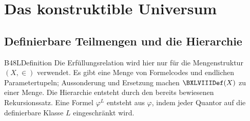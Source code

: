 \section{Das konstruktible Universum}

\subsection{Definierbare Teilmengen und die Hierarchie}

{B48LDefinition}{
}
\noindent
Die Erfüllungsrelation wird hier nur für die Mengenstruktur
\((X,\in)\) verwendet. Es gibt eine Menge von Formelcodes und endlichen
Parametertupeln; Aussonderung und Ersetzung machen
\(\BXLVIIIDef(X)\) zu einer Menge. Die Hierarchie entsteht durch den
bereits bewiesenen Rekursionssatz. Eine Formel \(\varphi^L\) entsteht
aus \(\varphi\), indem jeder Quantor auf die definierbare Klasse \(L\)
eingeschränkt wird.

